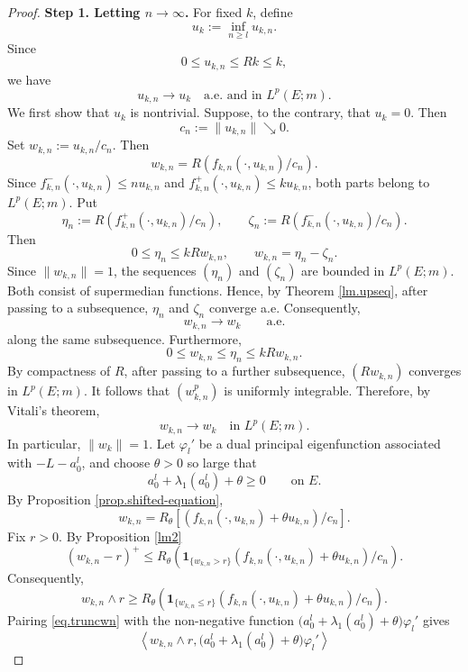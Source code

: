 \documentclass[11pt,a4paper,reqno]{amsart}
\theoremstyle{definition}
\numberwithin{equation}{section}
\begin{document}
\begin{proof}
{\bf Step 1. Letting $n\to\infty$.}  For fixed $k$, define
\[
u_k:=\inf_{n\ge l}u_{k,n}.
\]
Since
\[
0\le u_{k,n}\le Rk\le k,
\]
we have
\begin{equation}
\label{eq.untoUK}
u_{k,n}\longrightarrow u_k
\quad\text{a.e. and in }L^p(E;m).
\end{equation}
We first show that $u_k$ is nontrivial. Suppose, to the contrary,
that $u_k=0$. Then
\[
c_n:=\|u_{k,n}\|\searrow0.
\]
Set $w_{k,n}:=u_{k,n}/c_n$. Then 
\[
w_{k,n}
=
R\left(f_{k,n}(\cdot,u_{k,n})/c_n
\right).
\]
Since $f_{k,n}^-(\cdot,u_{k,n})\le n u_{k,n}$ and
$f_{k,n}^+(\cdot,u_{k,n})\le k u_{k,n} $, both parts belong to
$L^p(E;m)$.
Put
\[
\eta_n
:=
R\left(
f_{k,n}^+(\cdot,u_{k,n})/c_n
\right),
\qquad
\zeta_n
:=
R\left(
f_{k,n}^-(\cdot,u_{k,n})/c_n
\right).
\]
Then
\[
0\le \eta_n\le kRw_{k,n},
\qquad
w_{k,n}=\eta_n-\zeta_n.
\]
Since $\|w_{k,n}\|=1$, the sequences $(\eta_n)$ and $(\zeta_n)$ are
bounded in $L^p(E;m)$. Both consist of supermedian functions.
Hence, by Theorem \ref{lm.upseq}, after passing to a subsequence,
$\eta_n$ and $\zeta_n$ converge a.e. Consequently,
\[
w_{k,n}\longrightarrow w_k
\qquad\text{a.e.}
\]
along the same subsequence.
Furthermore,
\[
0\le w_{k,n}\le \eta_n\le kRw_{k,n}.
\]
By compactness of $R$, after passing to a further subsequence,
$(Rw_{k,n})$ converges in $L^p(E;m)$. It follows that
$(w_{k,n}^p)$ is uniformly integrable. Therefore, by Vitali's
theorem,
\begin{equation}
\label{eq.wnstrong}
w_{k,n}\longrightarrow w_k
\quad\text{in }L^p(E;m).
\end{equation}
In particular, $\|w_k\|=1$.
Let $\varphi_l'$ be a dual principal eigenfunction associated with
$-L-a_0^l$, and choose $\theta>0$ so large that
\[
a_0^l+\lambda_1(a_0^l)+\theta\ge0
\qquad\text{on }E.
\]
By Proposition \ref{prop.shifted-equation},
\[
w_{k,n}
=
R_\theta \left [(f_{k,n}(\cdot,u_{k,n})+\theta u_{k,n})/c_n\right].
\]
Fix $r>0$. By Proposition \ref{lm2}
\[
(w_{k,n}-r)^+
\le
R_\theta
\left(
\mathbf1_{\{w_{k,n}>r\}}(f_{k,n}(\cdot,u_{k,n})+\theta u_{k,n})/c_n
\right).
\]
Consequently,
\begin{equation}
\label{eq.truncwn}
w_{k,n}\wedge r
\ge
R_\theta
\left(
\mathbf1_{\{w_{k,n}\le r\}}(f_{k,n}(\cdot,u_{k,n})+\theta u_{k,n})/c_n
\right).
\end{equation}
Pairing  \eqref{eq.truncwn} with the non-negative function $\bigl(a_0^l+\lambda_1(a_0^l)+\theta\bigr)\varphi_l'$ gives
\begin{equation}
\label{eq.truncpair}
\left\langle w_{k,n}\wedge r,\bigl(a_0^l+\lambda_1(a_0^l)+\theta\bigr)\varphi_l'\right\rangle

\end{equation}
\end{proof}
\end{document}
